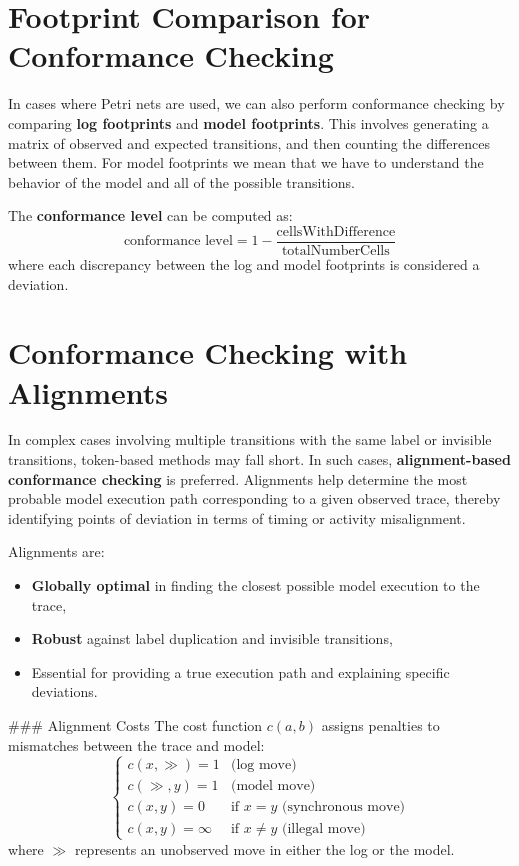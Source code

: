 \section{Footprint Comparison for Conformance Checking}

In cases where Petri nets are used, we can also perform conformance checking by comparing \textbf{log footprints} and \textbf{model footprints}. This involves generating a matrix of observed and expected transitions, and then counting the differences between them. For model footprints we mean that we have to understand the behavior of the model and all of the possible transitions.

The \textbf{conformance level} can be computed as:
\[
\text{conformance level} = 1 - \frac{\text{cellsWithDifference}}{\text{totalNumberCells}}
\]
where each discrepancy between the log and model footprints is considered a deviation.

\section{Conformance Checking with Alignments}

In complex cases involving multiple transitions with the same label or invisible transitions, token-based methods may fall short. In such cases, \textbf{alignment-based conformance checking} is preferred. Alignments help determine the most probable model execution path corresponding to a given observed trace, thereby identifying points of deviation in terms of timing or activity misalignment.

Alignments are:
\begin{itemize}
    \item \textbf{Globally optimal} in finding the closest possible model execution to the trace,
    \item \textbf{Robust} against label duplication and invisible transitions,
    \item Essential for providing a true execution path and explaining specific deviations.
\end{itemize}

### Alignment Costs
The cost function \(c(a, b)\) assigns penalties to mismatches between the trace and model:
\[
\begin{cases}
c(x, \gg) = 1 & \text{(log move)} \\
c(\gg, y) = 1 & \text{(model move)} \\
c(x, y) = 0 & \text{if } x = y \text{ (synchronous move)} \\
c(x, y) = \infty & \text{if } x \neq y \text{ (illegal move)}
\end{cases}
\]
where \(\gg\) represents an unobserved move in either the log or the model.

